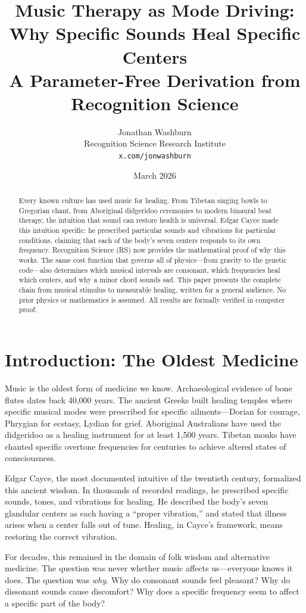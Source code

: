\documentclass[11pt,a4paper]{article}
\title{\vspace{-2cm}\textbf{Music Therapy as Mode Driving:\\
Why Specific Sounds Heal Specific Centers\\[6pt]
\large A Parameter-Free Derivation from Recognition Science}}
\author{Jonathan Washburn\\
\small Recognition Science Research Institute\\
\small \texttt{x.com/jonwashburn}}
\date{March 2026}
\begin{document}
\maketitle

\begin{abstract}
Every known culture has used music for healing. From Tibetan singing bowls to Gregorian chant, from Aboriginal didgeridoo ceremonies to modern binaural beat therapy, the intuition that sound can restore health is universal. Edgar Cayce made this intuition specific: he prescribed particular sounds and vibrations for particular conditions, claiming that each of the body's seven centers responds to its own frequency. Recognition Science (RS) now provides the mathematical proof of why this works. The same cost function that governs all of physics---from gravity to the genetic code---also determines which musical intervals are consonant, which frequencies heal which centers, and why a minor chord sounds sad. This paper presents the complete chain from musical stimulus to measurable healing, written for a general audience. No prior physics or mathematics is assumed. All results are formally verified in computer proof.
\end{abstract}

\section{Introduction: The Oldest Medicine}

Music is the oldest form of medicine we know. Archaeological evidence of bone flutes dates back 40,000 years. The ancient Greeks built healing temples where specific musical modes were prescribed for specific ailments---Dorian for courage, Phrygian for ecstasy, Lydian for grief. Aboriginal Australians have used the didgeridoo as a healing instrument for at least 1,500 years. Tibetan monks have chanted specific overtone frequencies for centuries to achieve altered states of consciousness.

Edgar Cayce, the most documented intuitive of the twentieth century, formalized this ancient wisdom. In thousands of recorded readings, he prescribed specific sounds, tones, and vibrations for healing. He described the body's seven glandular centers as each having a ``proper vibration,'' and stated that illness arises when a center falls out of tune. Healing, in Cayce's framework, means restoring the correct vibration.

For decades, this remained in the domain of folk wisdom and alternative medicine. The question was never whether music affects us---everyone knows it does. The question was \emph{why}. Why do consonant sounds feel pleasant? Why do dissonant sounds cause discomfort? Why does a specific frequency seem to affect a specific part of the body?
\end{document}
